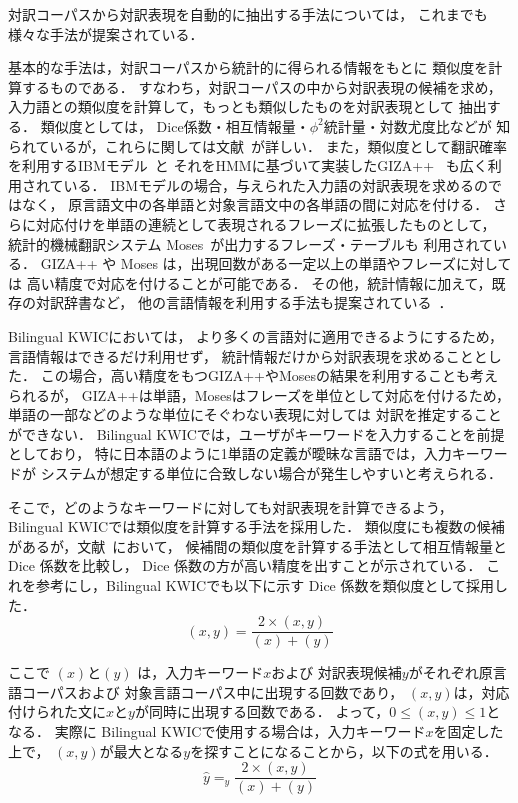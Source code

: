 \documentclass[japanese]{jnlp_1.4}
\newcommand{\argmax}{}
\newcommand{\freq}{}
\newcommand{\Dice}{}
\begin{document}
対訳コーパスから対訳表現を自動的に抽出する手法については，
これまでも様々な手法が提案されている．

基本的な手法は，対訳コーパスから統計的に得られる情報をもとに
類似度を計算するものである．
すなわち，対訳コーパスの中から対訳表現の候補を求め，
入力語との類似度を計算して，もっとも類似したものを対訳表現として
抽出する．
類似度としては，
Dice係数・相互情報量・$\phi^2$統計量・対数尤度比などが
知られているが，これらに関しては文献~\cite{Matsumoto00}が詳しい．
また，類似度として翻訳確率を利用するIBMモデル~\cite{IBMModel}と
それをHMMに基づいて実装したGIZA++~\cite{GIZA++}
も広く利用されている．
IBMモデルの場合，与えられた入力語の対訳表現を求めるのではなく，
原言語文中の各単語と対象言語文中の各単語の間に対応を付ける．
さらに対応付けを単語の連続として表現されるフレーズに拡張したものとして，
統計的機械翻訳システム Moses~\cite{Moses}が出力するフレーズ・テーブルも
利用されている．
GIZA++ や Moses は，出現回数がある一定以上の単語やフレーズに対しては
高い精度で対応を付けることが可能である．
その他，統計情報に加えて，既存の対訳辞書など，
他の言語情報を利用する手法も提案されている~\cite{Kumano94,Izuha04}．

Bilingual KWICにおいては，
より多くの言語対に適用できるようにするため，
言語情報はできるだけ利用せず，
統計情報だけから対訳表現を求めることとした．
この場合，高い精度をもつGIZA++やMosesの結果を利用することも考えられるが，
GIZA++は単語，Mosesはフレーズを単位として対応を付けるため，
単語の一部などのような単位にそぐわない表現に対しては
対訳を推定することができない．
Bilingual KWICでは，ユーザがキーワードを入力することを前提としており，
特に日本語のように1単語の定義が曖昧な言語では，入力キーワードが
システムが想定する単位に合致しない場合が発生しやすいと考えられる．


そこで，どのようなキーワードに対しても対訳表現を計算できるよう，
Bilingual KWICでは類似度を計算する手法を採用した．
類似度にも複数の候補があるが，文献~\cite{Kitamura97}において，
候補間の類似度を計算する手法として相互情報量と Dice 係数を比較し，
Dice 係数の方が高い精度を出すことが示されている．
これを参考にし，Bilingual KWICでも以下に示す Dice 係数を類似度として採用した．
\begin{equation}
\label{eq1}
 \Dice(x,y) = \frac{2\times \freq(x,y)}{\freq(x) + \freq(y)}
\end{equation}

ここで $\freq(x)$と$\freq(y)$ は，入力キーワード$x$および
対訳表現候補$y$がそれぞれ原言語コーパスおよび
対象言語コーパス中に出現する回数であり，
$\freq(x,y)$は，対応付けられた文に$x$と$y$が同時に出現する回数である．
よって，$0 \leq \Dice(x,y) \leq 1$となる．
実際に Bilingual KWICで使用する場合は，入力キーワード$x$を固定した上で，
$\Dice(x,y)$が最大となる$y$を探すことになることから，以下の式を用いる．
\begin{equation}
\label{eq2}
 \hat{y} = \argmax_{y} \frac{2\times \freq(x,y)}{\freq(x) + \freq(y)}
\end{equation}
\end{document}
